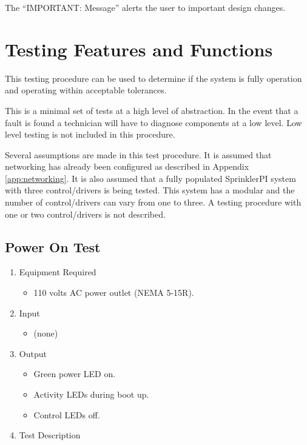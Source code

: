 \documentclass{article}
\begin{document}
The ``IMPORTANT: Message'' alerts the user to important design changes.


\section{Testing Features and Functions}

This testing procedure can be used to determine if the system
is fully operation and operating within acceptable tolerances.

This is a minimal set of tests at a high level of abstraction.
In the event that a fault is found a technician will have to
diagnose components at a low level.
Low level testing is not included in this procedure.

Several assumptions are made in this test procedure.
It is assumed that networking has already been configured as
described in Appendix \ref{app:networking}.
It is also assumed that a fully populated SprinklerPI system with
three control/drivers is being tested.
This system has a modular and the number of control/drivers can vary
from one to three.
A testing procedure with one or two control/drivers is not described.

\subsection{Power On Test}


\begin{enumerate}
\item Equipment Required
	\begin{itemize}
		\item 110 volts AC power outlet (NEMA 5-15R).
	\end{itemize}
\item Input
	\begin{itemize}
	\item (none)
	\end{itemize}
\item Output
	\begin{itemize}
	\item Green power LED on.
	\item Activity LEDs during boot up.
	\item Control LEDs off.
	\end{itemize}
\item Test Description \\
\end{enumerate}
\end{document}
